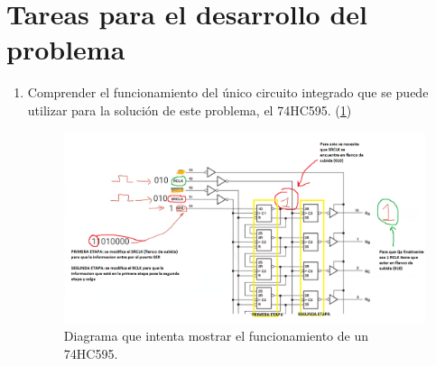 \documentclass{article}
\begin{document}
\section{Tareas para el desarrollo del problema} \label{imagenes}
\begin{enumerate}
  \item Comprender el funcionamiento del único circuito integrado que se puede utilizar para la solución de este problema, el 74HC595. (\ref{fig:Funcionamiento74HC595})
  
 \begin{figure}[h]
\includegraphics[width=16cm]{FUNCIONAMIENTO74HC595.png}
\centering
\caption{Diagrama que intenta mostrar el funcionamiento de un 74HC595.}
\label{fig:Funcionamiento74HC595}
\end{figure}


\end{enumerate}
\end{document}
